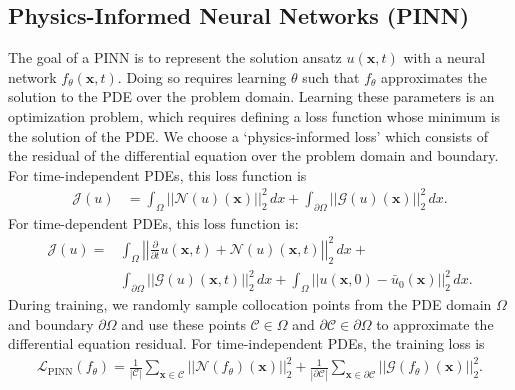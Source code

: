 \subsection{Physics-Informed Neural Networks (PINN)}
The goal of a PINN is to represent the solution ansatz $u(\bm{x},t)$ with a neural network $f_\theta(\bm{x},t)$. 
Doing so requires learning $\theta$ such that $f_\theta$ approximates the solution to the PDE over the problem domain.
Learning these parameters is an optimization problem, which requires defining a loss function whose minimum is the solution of the PDE.
We choose a `physics-informed loss' which consists of the residual of the differential equation over the problem domain and boundary. For time-independent PDEs, this loss function is
\begin{align}\label{eq:pinn_loss_function}
  \mathcal{J}(u) &= \int_{\Omega} \left|\left| \mathcal{N}(u)(\bm{x})\right|\right|^2_2 \, dx + \int_{\partial\Omega} \left|\left| \mathcal{G}(u)(\bm{x})\right|\right| _2^2 \, dx.
\end{align}
For time-dependent PDEs, this loss function is: 
\begin{align}\label{eq:pinn_loss_function}
  \mathcal{J}(u) = & \int_{\Omega} \left|\left| \frac{\partial}{\partial t}u(\bm{x}, t) + \mathcal{N}(u)(\bm{x}, t)\right|\right|^2_2 \, dx + \\
  & \int_{\partial\Omega} \left|\left| \mathcal{G}(u)(\bm{x}, t)\right|\right| _2^2 \, dx + \int_{\Omega} \left|\left| u(\bm{x}, 0) - \bar{u}_0(\bm{x}) \right|\right| _2^2 \, dx .
\end{align}
During training, we randomly sample collocation points from the PDE domain $\Omega$ and boundary $\partial \Omega$ and use these points $\mathcal{C} \in \Omega$ and $\partial \mathcal{C} \in \partial \Omega$ to approximate the differential equation residual. For time-independent PDEs, the training loss is
\begin{align}\label{eq:pinn_training_loss}
    \mathcal{L}_{\text{PINN}}(f_\theta) = \frac{1}{|\mathcal{C}|} \sum_{\bm{x} \in \mathcal{C}} \left|\left| \mathcal{N} (f_{\theta})(\bm{x}) \right|\right|_2^2  + \frac{1}{|\partial \mathcal{C}|}  \sum_{{\bm{x} \in \mathcal{\partial \mathcal{C}}} } \left|\left|\mathcal{G}(f_{\theta})(\bm{x})\right|\right|_2^2.
\end{align}
